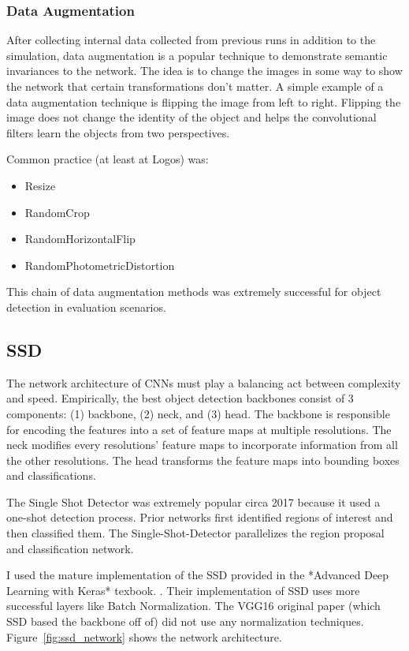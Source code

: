 \documentclass[12pt]{article}
\begin{document}
\subsubsection{Data Augmentation}
After collecting internal data collected from previous runs in addition to the simulation, data augmentation is a popular technique to demonstrate semantic invariances to the network. \cite{krizhevskyImageNetClassificationDeep2012} The idea is to change the images in some way to show the network that certain transformations don't matter. A simple example of a data augmentation technique is flipping the image from left to right. Flipping the image does not change the identity of the object and helps the convolutional filters learn the objects from two perspectives.

Common practice (at least at Logos) was:
\begin{itemize}
    \item Resize
    \item RandomCrop
    \item RandomHorizontalFlip
    \item RandomPhotometricDistortion
\end{itemize}
This chain of data augmentation methods was extremely successful for object detection in evaluation scenarios.

\subsection{SSD}
The network architecture of CNNs must play a balancing act between complexity and speed. Empirically, the best object detection backbones consist of 3 components: (1) backbone, (2) neck, and (3) head.
The backbone is responsible for encoding the features into a set of feature maps at multiple resolutions. The neck modifies every resolutions' feature maps to incorporate information from all the other resolutions. \cite{linFeaturePyramidNetworks2017} The head transforms the feature maps into bounding boxes and classifications.

The Single Shot Detector was extremely popular circa 2017 because it used a one-shot detection process. \cite{liuSSDSingleShot2016} Prior networks first identified regions of interest and then classified them. The Single-Shot-Detector parallelizes the region proposal and classification network. 

I used the mature implementation of the SSD provided in the *Advanced Deep Learning with Keras* texbook. \cite{atienzaAdvancedDeepLearning2020}. Their implementation of SSD uses more successful layers like Batch Normalization. \cite{ioffeBatchNormalizationAccelerating2015}  The VGG16 original paper (which SSD based the backbone off of) did not use any normalization techniques. \cite{simonyanVeryDeepConvolutional2015} Figure~\ref{fig:ssd_network} shows the network architecture.
\end{document}
